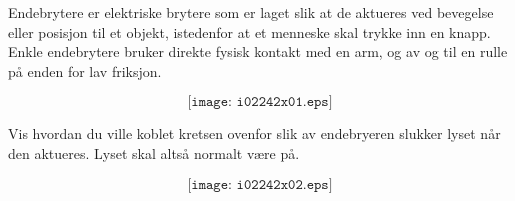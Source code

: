 

Endebrytere er elektriske brytere som er laget slik at de aktueres ved bevegelse eller posisjon til et objekt, istedenfor at et menneske skal trykke inn en knapp. Enkle endebrytere bruker direkte fysisk kontakt med en arm, og av og til en rulle på enden for lav friksjon. 

$$\texttt{[image: i02242x01.eps]}$$

\vskip 30pt

Vis hvordan du ville koblet kretsen ovenfor slik av endebryeren slukker lyset når den aktueres. Lyset skal altså normalt være på. 







$$\texttt{[image: i02242x02.eps]}$$











